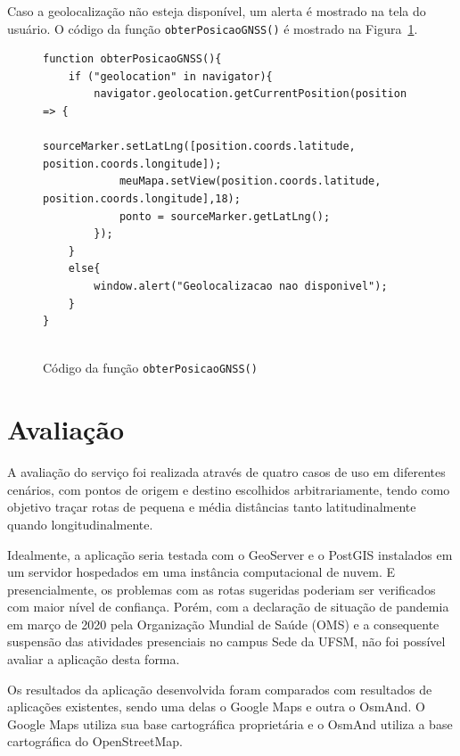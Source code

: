 \documentclass[oneside,openright,12pt]{ufsm_2015} %
\begin{document}
Caso a geolocalização não esteja disponível, um alerta é mostrado na tela do usuário. 
O código da função {\tt obterPosicaoGNSS()} é mostrado na Figura~\ref{codigo:obterposicao}.

\begin{figure}
    \centering

    \caption{Código da função {\tt obterPosicaoGNSS()}}
    \label{codigo:obterposicao}

\begin{lstlisting}[]
function obterPosicaoGNSS(){
    if ("geolocation" in navigator){
        navigator.geolocation.getCurrentPosition(position => {
            sourceMarker.setLatLng([position.coords.latitude, position.coords.longitude]);
            meuMapa.setView(position.coords.latitude, position.coords.longitude],18);
            ponto = sourceMarker.getLatLng();
        });
    }
    else{
        window.alert("Geolocalizacao nao disponivel");
    }
}
    
\end{lstlisting}
 \end{figure}
\chapter{Avaliação}
\label{sec:avaliacao}

A avaliação do serviço foi realizada através de quatro casos de uso em diferentes cenários, com pontos de origem e destino escolhidos arbitrariamente, tendo como objetivo traçar rotas de pequena e média distâncias tanto latitudinalmente quando longitudinalmente. 

Idealmente, a aplicação seria testada com o GeoServer e o PostGIS instalados em um servidor hospedados em uma instância computacional de nuvem. 
E presencialmente, os problemas com as rotas sugeridas poderiam ser verificados com maior nível de confiança. 
Porém, com a declaração de situação de pandemia em março de 2020 pela Organização Mundial de Saúde (OMS) e a consequente suspensão das atividades presenciais no campus Sede da UFSM, não foi possível avaliar a aplicação desta forma.



Os resultados da aplicação desenvolvida foram comparados com resultados de aplicações existentes, sendo uma delas o Google Maps e outra o OsmAnd. 
O Google Maps utiliza sua base cartográfica proprietária e o OsmAnd utiliza a base cartográfica do OpenStreetMap.
\end{document}

